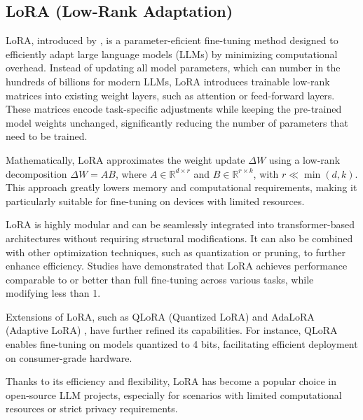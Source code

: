

\subsection{LoRA (Low-Rank Adaptation)}     %


LoRA, introduced by \cite{Hu2021LoRA}, is a parameter-eficient fine-tuning method designed to efficiently adapt large language models (LLMs) by minimizing computational overhead. Instead of updating all model parameters, which can number in the hundreds of billions for modern LLMs, LoRA introduces trainable low-rank matrices into existing weight layers, such as attention or feed-forward layers. These matrices encode task-specific adjustments while keeping the pre-trained model weights unchanged, significantly reducing the number of parameters that need to be trained.

Mathematically, LoRA approximates the weight update $\Delta W$ using a low-rank decomposition $\Delta W = A B$, where $A \in \mathbb{R}^{d \times r}$ and $B \in \mathbb{R}^{r \times k}$, with $r \ll \min(d,k)$. This approach greatly lowers memory and computational requirements, making it particularly suitable for fine-tuning on devices with limited resources.

LoRA is highly modular and can be seamlessly integrated into transformer-based architectures without requiring structural modifications. It can also be combined with other optimization techniques, such as quantization or pruning, to further enhance efficiency. Studies have demonstrated that LoRA achieves performance comparable to or better than full fine-tuning across various tasks, while modifying less than 1.%

Extensions of LoRA, such as QLoRA (Quantized LoRA) \citep{Dettmers2023QLoRA} and AdaLoRA (Adaptive LoRA) \citep{Zhang2023AdaLora}, have further refined its capabilities. For instance, QLoRA enables fine-tuning on models quantized to 4 bits, facilitating efficient deployment on consumer-grade hardware.  %

Thanks to its efficiency and flexibility, LoRA has become a popular choice in open-source LLM projects, especially for scenarios with limited computational resources or strict privacy requirements.


